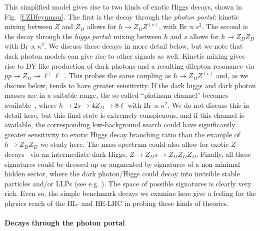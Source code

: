 This simplified model gives rise to two kinds of exotic Higgs decays, shown in Fig.~\ref{f.ZDfeynman}. The first is the decay through the \emph{photon portal}: kinetic mixing between $Z$ and $Z_D$ allows for $h\to Z_D Z^{(\star)}$, with $\mathrm{Br} \propto \epsilon^2$. The second is the decay through the \emph{higgs portal}: mixing between $h$ and $s$ allows for $h \to Z_D Z_D$ with $\mathrm{Br} \propto \kappa^2$. We discuss these decays in more detail below, but we note that dark photon models can give rise to other signals as well. 
%
Kinetic mixing gives rise to DY-like production of dark photons and a resulting dilepton resonance via $p p \to Z_D \to \ell^+ \ell^-$. This probes the same coupling as $h \to Z_D Z^{(\star)}$ and, as we discuss below, tends to have greater sensitivity. 
%
If the dark higgs and dark photon masses are in a suitable range, the so-called ``platinum channel'' becomes available~\cite{Izaguirre:2018atq}, where $h \to 2s \to 4 Z_D \to 8 \ell$ with $\mathrm{Br} \propto \kappa^2$. We do not discuss this in detail here, but this final state is extremely conspicuous, and if this channel is available, the corresponding low-background search could have significantly greater sensitivity to exotic Higgs decay branching ratio  than the example of $h \to Z_D Z_D$ we study here. 
%
The mass spectrum could also allow for exotic $Z$-decays~\cite{Blinov:2017dtk} via an intermediate dark Higgs, $Z \to Z_D s \to Z_D Z_D Z_D$. 
%
Finally, all these signatures could be dressed up or augmented by signatures of a non-minimal hidden sector, where the dark photon/Higgs could decay into invisible stable particles and/or LLPs (see e.g. \cite{Alexander:2016aln, Curtin:2018mvb}).
%
The space of possible signatures is clearly very rich. Even so, the simple benchmark decays we examine here give a feeling for the physics reach of the HL- and HE-LHC in probing these kinds of theories. 

\bigskip

\paragraph{Decays through the photon portal}



